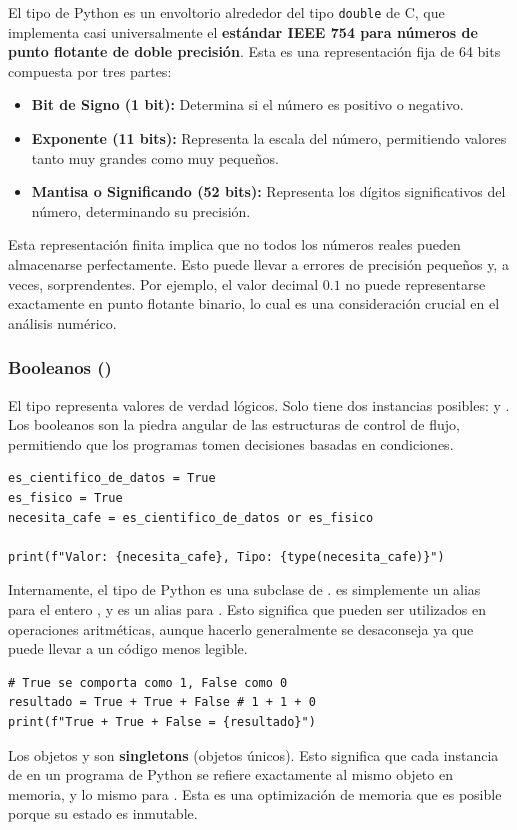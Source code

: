 \begin{remark}
El tipo  de Python es un envoltorio alrededor del tipo \texttt{double} de C, que implementa casi universalmente el \textbf{estándar IEEE 754 para números de punto flotante de doble precisión}. Esta es una representación fija de 64 bits compuesta por tres partes:
\begin{itemize}
    \item \textbf{Bit de Signo (1 bit):} Determina si el número es positivo o negativo.
    \item \textbf{Exponente (11 bits):} Representa la escala del número, permitiendo valores tanto muy grandes como muy pequeños.
    \item \textbf{Mantisa o Significando (52 bits):} Representa los dígitos significativos del número, determinando su precisión.
\end{itemize}
Esta representación finita implica que no todos los números reales pueden almacenarse perfectamente. Esto puede llevar a errores de precisión pequeños y, a veces, sorprendentes. Por ejemplo, el valor decimal $0.1$ no puede representarse exactamente en punto flotante binario, lo cual es una consideración crucial en el análisis numérico.
\end{remark}

\subsubsection*{Booleanos ()}
El tipo  representa valores de verdad lógicos. Solo tiene dos instancias posibles:  y . Los booleanos son la piedra angular de las estructuras de control de flujo, permitiendo que los programas tomen decisiones basadas en condiciones.

\text{ }\begin{verbatim}
es_cientifico_de_datos = True
es_fisico = True
necesita_cafe = es_cientifico_de_datos or es_fisico

print(f"Valor: {necesita_cafe}, Tipo: {type(necesita_cafe)}")
\end{verbatim}

\begin{remark}
Internamente, el tipo  de Python es una subclase de .  es simplemente un alias para el entero , y  es un alias para . Esto significa que pueden ser utilizados en operaciones aritméticas, aunque hacerlo generalmente se desaconseja ya que puede llevar a un código menos legible.
\text{ }\begin{verbatim}
# True se comporta como 1, False como 0
resultado = True + True + False # 1 + 1 + 0
print(f"True + True + False = {resultado}")
\end{verbatim}
Los objetos  y  son \textbf{singletons} (objetos únicos). Esto significa que cada instancia de  en un programa de Python se refiere exactamente al mismo objeto en memoria, y lo mismo para . Esta es una optimización de memoria que es posible porque su estado es inmutable.
\end{remark}

